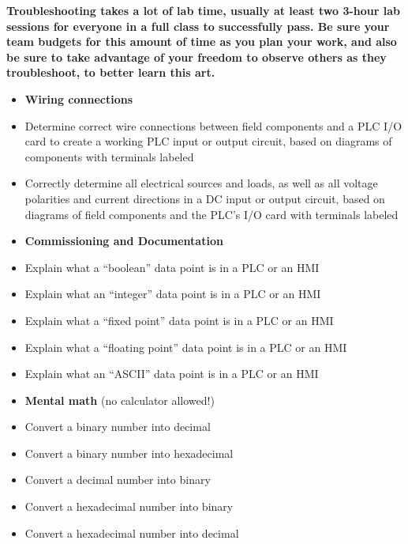 \begin{itemize}
\vskip 10pt

{\bf Troubleshooting takes a lot of lab time, usually at least two 3-hour lab sessions for everyone in a full class to successfully pass.  Be sure your team budgets for this amount of time as you plan your work, and also be sure to take advantage of your freedom to observe others as they troubleshoot, to better learn this art.}







\vfil \eject

\noindent
{} 

\begin{itemize}
\item{} {\bf Wiring connections}
\item{} Determine correct wire connections between field components and a PLC I/O card to create a working PLC input or output circuit, based on diagrams of components with terminals labeled
\item{} Correctly determine all electrical sources and loads, as well as all voltage polarities and current directions in a DC input or output circuit, based on diagrams of field components and the PLC's I/O card with terminals labeled
\end{itemize}

\filbreak

\begin{itemize}
\item{} {\bf Commissioning and Documentation}
\item{} Explain what a ``boolean'' data point is in a PLC or an HMI 
\item{} Explain what an ``integer'' data point is in a PLC or an HMI 
\item{} Explain what a ``fixed point'' data point is in a PLC or an HMI 
\item{} Explain what a ``floating point'' data point is in a PLC or an HMI 
\item{} Explain what an  ``ASCII'' data point is in a PLC or an HMI 
\end{itemize}

\filbreak

\begin{itemize}
\item{} {\bf Mental math} (no calculator allowed!)
\item{} Convert a binary number into decimal
\item{} Convert a binary number into hexadecimal
\item{} Convert a decimal number into binary
\item{} Convert a hexadecimal number into binary
\item{} Convert a hexadecimal number into decimal
\end{itemize}


\end{itemize}
